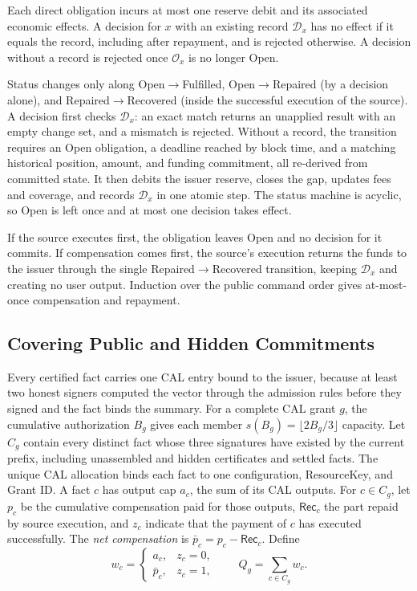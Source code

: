 \begin{lemma}
\label{lem:security-decision}
Each direct obligation incurs at most one reserve debit and its
associated economic effects. A decision for $x$ with an existing record
$\mathcal D_x$ has no effect if it equals the record, including after
repayment, and is rejected otherwise. A decision without a record is
rejected once $\mathcal O_x$ is no longer Open.
\end{lemma}
\begin{IEEEproof}
Status changes only along Open$\to$Fulfilled, Open$\to$Repaired (by a decision alone), and Repaired$\to$Recovered (inside the successful execution of the source). A decision first checks $\mathcal D_x$: an exact match returns an unapplied result with an empty change set, and a mismatch is rejected. Without a record, the transition requires an Open obligation, a deadline reached by block time, and a matching historical position, amount, and funding commitment, all re-derived from committed state. It then debits the issuer reserve, closes the gap, updates fees and coverage, and records $\mathcal D_x$ in one atomic step. The status machine is acyclic, so Open is left once and at most one decision takes effect.

If the source executes first, the obligation leaves Open and no decision for it commits. If compensation comes first, the source's execution returns the funds to the issuer through the single Repaired$\to$Recovered transition, keeping $\mathcal D_x$ and creating no user output. Induction over the public command order gives at-most-once compensation and repayment.
\end{IEEEproof}

\subsection{Covering Public and Hidden Commitments}
\label{sec:security-coverage}

Every certified fact carries one CAL entry bound to the issuer, because at least two honest signers computed the vector through the admission rules before they signed and the fact binds the summary. For a complete CAL grant $g$, the cumulative authorization $B_g$ gives each member $s(B_g)=\lfloor2B_g/3\rfloor$ capacity. Let $C_g$ contain every distinct fact whose three signatures have existed by the current prefix, including unassembled and hidden certificates and settled facts. The unique CAL allocation binds each fact to one configuration, ResourceKey, and Grant ID. A fact $c$ has output cap $a_c$, the sum of its CAL outputs. For $c\in C_g$, let $p_c$ be the cumulative compensation paid for those outputs, $\mathsf{Rec}_c$ the part repaid by source execution, and $z_c$ indicate that the payment of $c$ has executed successfully. The \emph{net compensation} is $\bar p_c=p_c-\mathsf{Rec}_c$. Define
\begin{equation}
  w_c=\begin{cases}a_c,&z_c=0,\\\bar p_c,&z_c=1,\end{cases}
  \qquad Q_g=\sum_{c\in C_g}w_c.
  \label{eq:security-risk}
\end{equation}

